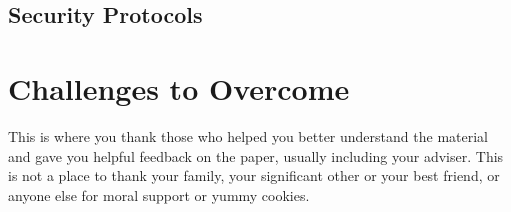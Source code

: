 \documentclass[sigplan,screen,nonacm]{acmart}
\begin{document}
\subsection{Security Protocols}
\label{subsec:Security Protocols}

\section{Challenges to Overcome}
\label{sec:Challenges to Overcome}


\begin{acks}
  This is where you thank those who helped you better understand the material
  and gave you helpful feedback on the paper, usually including your adviser.
  This is not a place to thank your family, your significant other or your best friend,
  or anyone else  for moral support or yummy cookies.
\end{acks}



\end{document}
